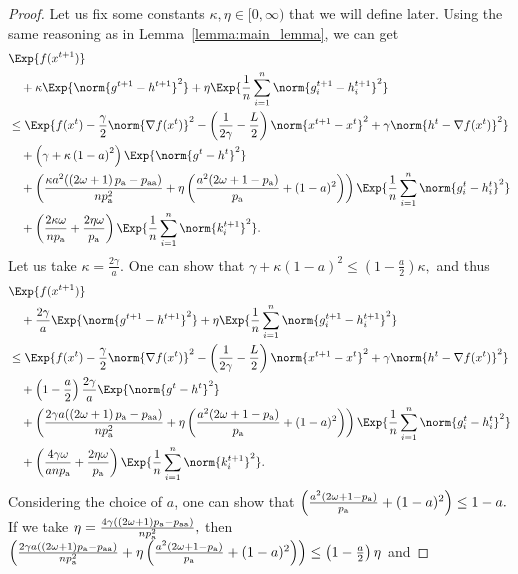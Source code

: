 \documentclass{article}
\newcommand*{\probavailable}{\ensuremath{p_{\textnormal{a}}}}
\newcommand*{\probpairaa}{\ensuremath{p_{\textnormal{aa}}}}
\begin{document}
\begin{proof}
  Let us fix some constants $\kappa, \eta \in [0,\infty)$ that we will define later. Using the same reasoning as in Lemma~\ref{lemma:main_lemma}, we can get
  \begin{align*}
      &\Exp{f(x^{t + 1})} \nonumber \\
      &\quad  + \kappa \Exp{\norm{g^{t+1} - h^{t+1}}^2} + \eta \Exp{\frac{1}{n}\sum_{i=1}^n\norm{g^{t+1}_i - h^{t+1}_i}^2} \nonumber\\
      &\leq \Exp{f(x^t) - \frac{\gamma}{2}\norm{\nabla f(x^t)}^2 - \left(\frac{1}{2\gamma} - \frac{L}{2}\right)
      \norm{x^{t+1} - x^t}^2 + \gamma \norm{h^{t} - \nabla f(x^t)}^2}\nonumber\\
      &\quad + \left(\gamma + \kappa \left(1 - a\right)^2\right)\Exp{\norm{g^{t} - h^t}^2}\nonumber\\
      &\quad + \left(\frac{\kappa a^2 (\left(2 \omega + 1\right)\probavailable - \probpairaa)}{n \probavailable^2} + \eta\left(\frac{a^2(2\omega + 1 - \probavailable)}{\probavailable} + (1 - a)^2\right)\right)\Exp{\frac{1}{n} \sum_{i=1}^n\norm{g^t_i - h^{t}_i}^2}\nonumber\\
      &\quad + \left(\frac{2 \kappa \omega}{n \probavailable} + \frac{2 \eta \omega}{\probavailable}\right)\Exp{\frac{1}{n} \sum_{i=1}^n\norm{k^{t+1}_i}^2}.
  \end{align*}
  Let us take $\kappa = \frac{2\gamma}{a}.$ One can show that $\gamma + \kappa \left(1 - a\right)^2 \leq \left(1 - \frac{a}{2}\right)\kappa, $ and thus
  \begin{align*}
      &\Exp{f(x^{t + 1})} \\
      &\quad  + \frac{2\gamma}{a} \Exp{\norm{g^{t+1} - h^{t+1}}^2} + \eta \Exp{\frac{1}{n}\sum_{i=1}^n\norm{g^{t+1}_i - h^{t+1}_i}^2}\\
      &\leq \Exp{f(x^t) - \frac{\gamma}{2}\norm{\nabla f(x^t)}^2 - \left(\frac{1}{2\gamma} - \frac{L}{2}\right)
      \norm{x^{t+1} - x^t}^2 + \gamma \norm{h^{t} - \nabla f(x^t)}^2}\nonumber\\
      &\quad + \left(1 - \frac{a}{2}\right)\frac{2\gamma}{a}\Exp{\norm{g^{t} - h^t}^2}\nonumber\\
      &\quad + \left(\frac{2\gamma a (\left(2 \omega + 1\right)\probavailable - \probpairaa)}{n \probavailable^2} + \eta\left(\frac{a^2(2\omega + 1 - \probavailable)}{\probavailable} + (1 - a)^2\right)\right)\Exp{\frac{1}{n} \sum_{i=1}^n\norm{g^t_i - h^{t}_i}^2}\nonumber\\
      &\quad + \left(\frac{4 \gamma \omega}{a n \probavailable} + \frac{2 \eta \omega}{\probavailable}\right)\Exp{\frac{1}{n} \sum_{i=1}^n\norm{k^{t+1}_i}^2}.
  \end{align*}
  Considering the choice of $a$, one can show that $\left(\frac{a^2(2\omega + 1 - \probavailable)}{\probavailable} + (1 - a)^2\right) \leq 1 - a.$ If we take $\eta = \frac{4 \gamma (\left(2 \omega + 1\right)\probavailable - \probpairaa)}{n \probavailable^2},$ then $\left(\frac{2\gamma a (\left(2 \omega + 1\right)\probavailable - \probpairaa)}{n \probavailable^2} + \eta\left(\frac{a^2(2\omega + 1 - \probavailable)}{\probavailable} + (1 - a)^2\right)\right) \leq \left(1 - \frac{a}{2}\right)\eta$ and


\end{proof}
\end{document}
